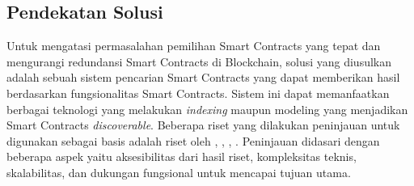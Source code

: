 \subsection{Pendekatan Solusi}

Untuk mengatasi permasalahan pemilihan Smart Contracts yang tepat dan mengurangi redundansi Smart Contracts di Blockchain, solusi yang diusulkan adalah sebuah sistem pencarian Smart Contracts yang dapat memberikan hasil berdasarkan fungsionalitas Smart Contracts. Sistem ini dapat memanfaatkan berbagai teknologi yang melakukan \textit{indexing} maupun modeling yang menjadikan Smart Contracts \textit{discoverable}.
Beberapa riset yang dilakukan peninjauan untuk digunakan sebagai basis adalah riset oleh \cite{third2017linked}, \cite{aimar2023extraction}, \cite{baqa2019semantic}, \cite{cano2021toward}. Peninjauan didasari dengan beberapa aspek yaitu aksesibilitas dari hasil riset, kompleksitas teknis, skalabilitas, dan dukungan fungsional untuk mencapai tujuan utama.






